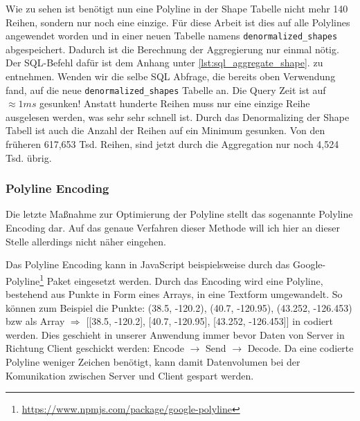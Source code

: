     Wie zu sehen ist benötigt nun eine Polyline in der Shape Tabelle nicht mehr 140 Reihen, sondern nur noch eine einzige. Für diese Arbeit ist dies auf alle Polylines angewendet worden und in einer neuen Tabelle namens \texttt{denormalized\_shapes} abgespeichert. Dadurch ist die Berechnung der Aggregierung nur einmal nötig. Der SQL-Befehl dafür ist dem Anhang unter \ref{lst:sql_aggregate_shape}. zu entnehmen.
    Wenden wir die selbe SQL Abfrage, die bereits oben Verwendung fand, auf die neue \texttt{denormalized\_shapes} Tabelle an. Die Query Zeit ist auf $\approx1ms$ gesunken! Anstatt hunderte Reihen muss nur eine einzige Reihe ausgelesen werden, was sehr sehr schnell ist. Durch das Denormalizing der Shape Tabell ist auch die Anzahl der Reihen auf ein Minimum gesunken. Von den früheren 617,653 Tsd. Reihen, sind jetzt durch die Aggregation nur noch 4,524 Tsd. übrig.
  

  \subsubsection*{Polyline Encoding}
  \label{ssub:polyline_encoding}
    Die letzte Maßnahme zur Optimierung der Polyline stellt das sogenannte Polyline Encoding dar. Auf das genaue Verfahren dieser Methode will ich hier an dieser Stelle allerdings nicht näher eingehen.

    Das Polyline Encoding kann in JavaScript beispielsweise durch das Google-Polyline\footnote{\url{https://www.npmjs.com/package/google-polyline}} Paket eingesetzt werden. Durch das Encoding wird eine Polyline, bestehend aus Punkte in Form eines Arrays, in eine Textform umgewandelt. So können zum Beispiel die Punkte: (38.5, -120.2), (40.7, -120.95), (43.252, -126.453) bzw als Array $\Rightarrow$  [[38.5, -120.2], [40.7, -120.95], [43.252, -126.453]] in
    \colorbox{materialGrey}{\texttt{\color{white}{\_p\textasciitilde iF\textasciitilde ps|U\_ulLnnqC\_mqNvxq`@}}}
    codiert werden. Dies geschieht in unserer Anwendung immer bevor Daten von Server in Richtung Client geschickt werden: Encode $\rightarrow$ Send $\rightarrow$ Decode. Da eine codierte Polyline weniger Zeichen benötigt, kann damit Datenvolumen bei der Komunikation zwischen Server und Client gespart werden.



